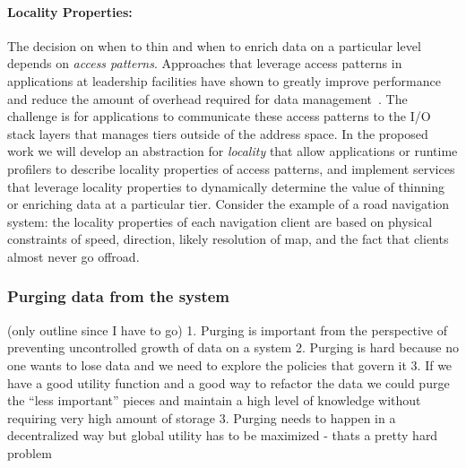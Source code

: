 \paragraph{Locality Properties:} The decision on when to thin and when to
enrich data on a particular level depends on \emph{access patterns}.
Approaches that leverage access patterns in applications at leadership facilities
 have shown to greatly improve performance and reduce the amount
of overhead required for data management~\cite{he:hpdc13}. The
challenge is for applications to communicate these access patterns
to the I/O stack layers that manages tiers outside of the address
space. In the proposed work we will develop an abstraction for
\emph{locality} that allow applications or runtime profilers to
describe locality properties of access patterns, and implement
services that leverage locality properties to dynamically determine
the value of thinning or enriching data at a particular tier.
Consider the example of a road navigation system: the locality
properties of each navigation client are based on physical constraints
of speed, direction, likely resolution of map, and the fact that
clients almost never go offroad.

\subsubsection{Purging data from the system}
\label{sec:purging-data}
(only outline since I have to go)
1. Purging is important from the perspective of preventing uncontrolled
growth of data on a system
2. Purging is hard because no one wants to lose data and we need to explore
the policies that govern it
3. If we have a good utility function and a good way to refactor the data we
could purge the ``less important'' pieces and maintain a high level of
knowledge without requiring very high amount of storage
3. Purging needs to happen in a decentralized way but global utility has to
be maximized - thats a pretty hard problem 





